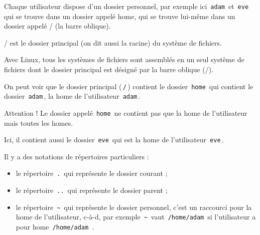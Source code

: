 \documentclass[11pt,a4paper]{article}
\begin{document}
			    Chaque utilisateur dispose d'un dossier personnel, par exemple ici \,\verb|adam|\, et \,\verb|eve|\,
			    qui se trouve dans un dossier appel\'e home, qui se trouve lui-m\^eme dans un dossier appel\'e / (la barre oblique). 
        
            \par
        
			    / est le dossier principal (on dit aussi la racine) du syst\`eme de fichiers.
        
            \par
        
			    Avec Linux, tous les syst\`emes de fichiers sont assembl\'es en un seul syst\`eme de fichiers dont le dossier principal est d\'esign\'e par la barre oblique (/).
        
            \par
        
          On peut voir que le dossier principal (\,\verb|/|\,) contient le dossier \,\verb|home|\, 
          qui contient le dossier \,\verb|adam|\,, 
          la home de l'utilisateur \,\verb|adam|\,.
        
            \par
        
          Attention ! Le dossier appel\'e \,\verb|home|\, ne contient pas que la home de l'utilisateur mais toutes les homes.
        
            \par
        
          Ici, il contient aussi le dossier \,\verb|eve|\, qui est la home de l'utilisateur \,\verb|eve|\,.
        
            \par
        
          Il y a des notations de r\'epertoires particuliers :
          
					\begin{itemize}
				
			\item le r\'epertoire \,\verb|.|\, qui repr\'esente le dossier courant ;
			\item le r\'epertoire \,\verb|..|\, qui repr\'esente le dossier parent ;
			\item le r\'epertoire \,\verb|~|\, qui repr\'esente le dossier personnel, 
			        c'est un raccourci pour la home de l'utilisateur, c-\`a-d, par exemple \,\verb|~|\, vaut \,\verb|/home/adam|\, 
			        si l'utilisateur a pour home \,\verb|/home/adam|\, .
					\end{itemize}
				
\end{document}
